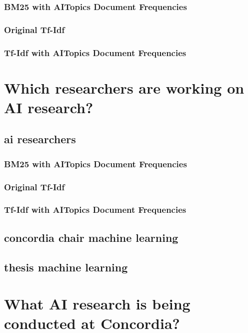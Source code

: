 \subsubsection{BM25 with AITopics Document Frequencies}\label{query-3-bm25-aitopics}

\subsubsection{Original Tf-Idf}

\subsubsection{Tf-Idf with AITopics Document Frequencies}

\section{Which researchers are working on AI research?}

\subsection{ai researchers}\label{query-4}

\subsubsection{BM25 with AITopics Document Frequencies}\label{query-4-bm25-aitopics}

\subsubsection{Original Tf-Idf}\label{query-4-tf-idf}

\subsubsection{Tf-Idf with AITopics Document Frequencies}\label{query-4-tf-idf-aitopics}

\subsection{concordia chair machine learning}

\subsection{thesis machine learning}

\section{What AI research is being conducted at Concordia?}

